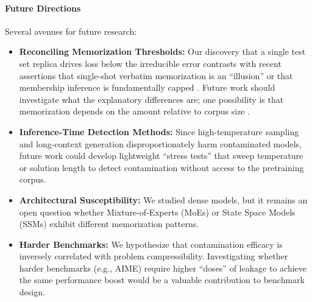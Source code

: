 \paragraph{Future Directions}
Several avenues for future research:
\begin{itemize}
    \item \textbf{Reconciling Memorization Thresholds:} Our discovery that a single test set replica drives loss below the irreducible error contrasts with recent assertions that single-shot verbatim memorization is an ``illusion'' \citep{huang2024demystifying} or that membership inference is fundamentally capped \citep{hayes2025exploring}. Future work should investigate what the explanatory differences are; one possibility is that memorization depends on the amount relative to corpus size \citep{schaeffer2025doseresponse, wei2025hubblemodelsuiteadvance}.
    \item \textbf{Inference-Time Detection Methods:} Since high-temperature sampling and long-context generation disproportionately harm contaminated models, future work could develop lightweight ``stress tests'' that sweep temperature or solution length to detect contamination without access to the pretraining corpus.
    \item \textbf{Architectural Susceptibility:} We studied dense models, but it remains an open question whether Mixture-of-Experts (MoEs) or State Space Models (SSMs) exhibit different memorization patterns.
    \item \textbf{Harder Benchmarks:} We hypothesize that contamination efficacy is inversely correlated with problem compressibility. Investigating whether harder benchmarks (e.g., AIME) require higher ``doses'' of leakage to achieve the same performance boost would be a valuable contribution to benchmark design.
\end{itemize}
